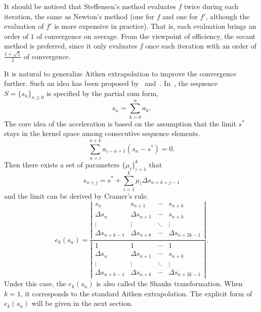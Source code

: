 \begin{remark}
    It should be noticed that Steffensen's method evaluates $f$ twice during each iteration, the same as Newton's method (one for $f$ and one for $f'$, although the evaluation of $f'$ is more expensive in practice). That is, each evaluation brings an order of $1$ of convergence on average. From the viewpoint of efficiency, the secant method is preferred, since it only evaluates $f$ once each iteration with an order of $\frac{1+\sqrt{5}}{2}$ of convergence. 
\end{remark}
It is natural to generalize Aitken extrapolation to improve the convergence further. Such an idea has been proposed by~\cite{schmidt1941xxxii} and~\cite{shanks1955non}. In~\cite{shanks1955non}, the sequence $S = \{s_n\}_{n\ge 0}$ is specified by the partial sum form,
\begin{equation}
    s_n = \sum_{k=0}^n a_k. 
\end{equation}
The core idea of the acceleration is based on the assumption that the limit $s^{\ast}$ stays in the kernel space among consecutive sequence elements. $$ \sum_{n=i}^{n+k} a_{i - n + 1} ( s_n -  s^{\ast} ) = 0.$$ Then there exists a set of parameters $\{ \mu_i \}_{i=1}^k $ that 
\begin{equation}
    s_{n+j} = s^{\ast} + \sum_{i=1}^k \mu_i \Delta s_{n+k+j-1}
\end{equation}
and the limit can be derived by Cramer's rule.
\begin{equation}
    e_k(s_n) = \frac{\left|\begin{matrix}
        s_n & s_{n+1} & \cdots & s_{n+k} \\
        \Delta s_{n} & \Delta s_{n+1} & \cdots & s_{n+k} \\
        \vdots & \vdots & \ddots & \vdots \\
        \Delta s_{n+k-1} & \Delta s_{n+k} & \cdots & \Delta s_{n+2k-1}
    \end{matrix} \right|}{\left|     
    \begin{matrix}
      1 & 1 & \cdots & 1 \\
        \Delta s_{n} & \Delta s_{n+1} & \cdots & s_{n+k} \\
        \vdots & \vdots & \ddots & \vdots \\
        \Delta s_{n+k-1} & \Delta s_{n+k} & \cdots & \Delta s_{n+2k-1}      
    \end{matrix}
\right|}.
\end{equation}
Under this case, the $ e_k(s_n) $ is also called the Shanks transformation. When $k=1$, it corresponds to the standard Aitken extrapolation. The explicit form of $ e_k(s_n) $ will be given in the next section.

